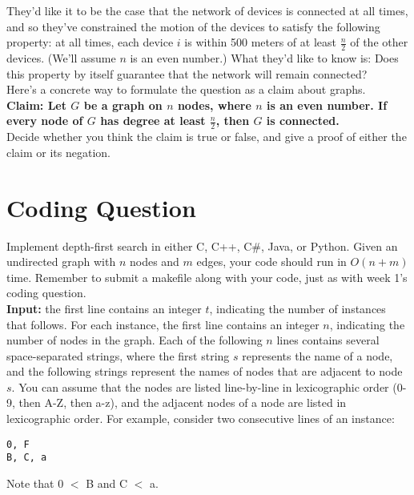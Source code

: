 \documentclass[answers]{exam}  %
\begin{document}
\begin{questions}
They'd like it to be the case that the network of devices is connected at all times, and so they've constrained the motion of the devices to satisfy the following property: at all times, each device $i$ is within 500 meters of at least $\frac{n}{2}$ of the other devices. (We'll assume $n$ is an even number.) What they'd like to know is: Does this property by itself guarantee that the network will remain connected? \\

Here’s a concrete way to formulate the question as a claim about graphs.\\

\textbf{Claim: Let $G$ be a graph on $n$ nodes, where $n$ is an even number. If every node of $G$ has degree at least $\frac{n}{2}$, then $G$ is connected.} \\

Decide whether you think the claim is true or false, and give a proof of either the claim or its negation. 

\begin{solutionbox}{4.5in} \vspace{1em}    

\end{solutionbox}

\pagebreak



\section*{Coding Question}
\question
Implement depth-first search in either C, C++, C\#, Java, or Python. Given an undirected graph with $n$ nodes and $m$ edges, your code should run in $O(n + m)$ time. Remember to submit a makefile along with your code, just as with week 1's coding question.\\

\textbf{Input:} the first line contains an integer $t$, indicating the number of instances that follows. For each instance, the first line contains an integer $n$, indicating the number of nodes in the graph. Each of the following $n$ lines contains several space-separated strings, where the first string $s$ represents the name of a node, and the following strings represent the names of nodes that are adjacent to node $s$. You can assume that the nodes are listed line-by-line in lexicographic order (0-9, then A-Z, then a-z), and the adjacent nodes of a node are listed in lexicographic order. For example, consider two consecutive lines of an instance:
\begin{verbatim}
0, F
B, C, a
\end{verbatim}
Note that 0 $<$ B and C $<$ a.\\


\end{questions}
\end{document}
